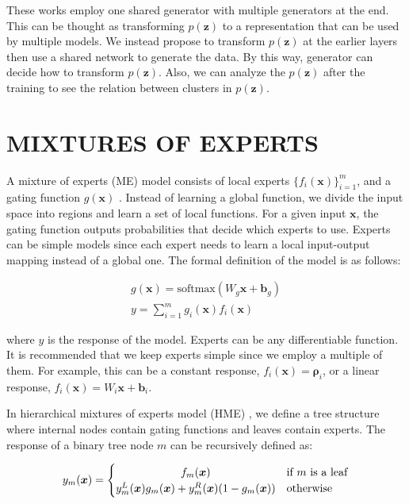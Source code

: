 \documentclass[a4paper,onesided,12pt]{report}
\begin{document}
These works employ one shared generator with multiple generators at the end. This can be thought as transforming $p(\boldsymbol{z})$ to a representation that can be used by multiple models. We instead propose to transform $p(\boldsymbol{z})$ at the earlier layers then use a shared network to generate the data. By this way, generator can decide how to transform $p(\boldsymbol{z})$. Also, we can analyze the $p(\boldsymbol{z})$ after the training to see the relation between clusters in $p(\boldsymbol{z})$.

\chapter{MIXTURES OF EXPERTS}
\label{chapter:me}

A mixture of experts (ME) model consists of local experts $\{f_i(\boldsymbol{x})\}_{i=1}^{m}$, and a gating function $g(\boldsymbol{x})$ \cite{me}. Instead of learning a global function, we divide the input space into regions and learn a set of local functions. For a given input $\boldsymbol{x}$, the gating function outputs probabilities that decide which experts to use. Experts can be simple models since each expert needs to learn a local input-output mapping instead of a global one. The formal definition of the model is as follows:

\begin{eqnarray}
g(\boldsymbol{x}) = \text{softmax}(W_g \boldsymbol{x} + \boldsymbol{b}_g)\\
y = \sum_{i=1}^m g_i(\boldsymbol{x}) f_i(\boldsymbol{x})
\end{eqnarray}

where $y$ is the response of the model. Experts can be any differentiable function. It is recommended that we keep experts simple since we employ a multiple of them. For example, this can be a constant response, $f_i(\boldsymbol{x})=\boldsymbol{\rho}_i$, or a linear response, $f_i(\boldsymbol{x})=W_i \boldsymbol{x} + \boldsymbol{b}_i$.

In hierarchical mixtures of experts model (HME) \cite{hme}, we define a tree structure where internal nodes contain gating functions and leaves contain experts. The response of a binary tree node $m$ can be recursively defined as:

\begin{equation}
y_m(\boldsymbol{x})=
	\begin{cases}
		\hfil f_m(\boldsymbol{x}) &\text{if $m$ is a leaf} \\
		\hfil y_m^{L}(\boldsymbol{x})g_m(\boldsymbol{x}) + y_m^{R}(\boldsymbol{x})(1 - g_m(\boldsymbol{x})) &\text{otherwise}
	\end{cases}
\end{equation}
\end{document}

